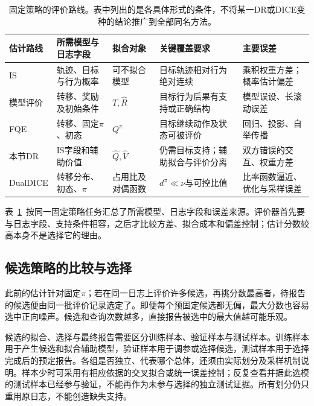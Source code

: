 \begin{table}[htbp]
  \centering
  \small
  \begin{tabularx}{\linewidth}{p{17mm}XXXX}
    \toprule
    估计路线 & 所需模型与日志字段 & 拟合对象 & 关键覆盖要求 & 主要误差 \\
    \midrule
    IS & 轨迹、目标与行为概率 & 可不拟合模型 & 目标轨迹相对行为绝对连续 & 乘积权重方差；概率估计偏差 \\
    模型评价 & 转移、奖励及初始条件 & $\widehat T,\widehat R$ & 目标行为后果有支持或正确结构 & 模型误设、长滚动误差 \\
    FQE & 转移、固定$\pi$、初态 & $Q^\pi$ & 目标继续动作及状态可被评价 & 回归、投影、自举传播 \\
    本节DR & IS字段和辅助价值 & $\widehat Q,\widehat V$ & 仍需目标支持；辅助拟合与评价分离 & 双方错误的交互、权重方差 \\
    DualDICE & 转移分布、初态、$\pi$ & 占用比及对偶函数 & $d^\pi\ll\nu$与可控比值 & 比率函数逼近、优化与采样误差 \\
    \bottomrule
  \end{tabularx}
  \caption{固定策略的评价路线。表中列出的是各具体形式的条件，不将某一DR或DICE变种的结论推广到全部同名方法。}
  \label{tab:rl-information-estimators}
\end{table}

表~\ref{tab:rl-information-estimators}~按同一固定策略任务汇总了所需模型、日志字段和误差来源。评价器首先要与日志字段、支持条件相容，之后才比较方差、拟合成本和偏差控制；估计分数较高本身不是选择它的理由。

\subsection{候选策略的比较与选择}
\label{sec:rl-information-selection}

此前的估计针对固定$\pi$；若在同一日志上评价许多候选，再挑分数最高者，待报告的候选便由同一批评价记录选定了。即便每个预固定候选都无偏，最大分数也容易选中正向噪声。候选和查询次数越多，直接报告被选中的最大值越可能乐观。

候选的拟合、选择与最终报告需要区分训练样本、验证样本与测试样本。训练样本用于产生候选和拟合辅助模型，验证样本用于调参或选择候选，测试样本用于选择完成后的预定报告。各组是否独立、代表哪个总体，还须由实际划分及采样机制说明。样本少时可采用有相应依据的交叉拟合或统一误差控制；反复查看并据此选模的测试样本已经参与验证，不能再作为未参与选择的独立测试证据。所有划分仍只重用原日志，不能创造缺失支持。

